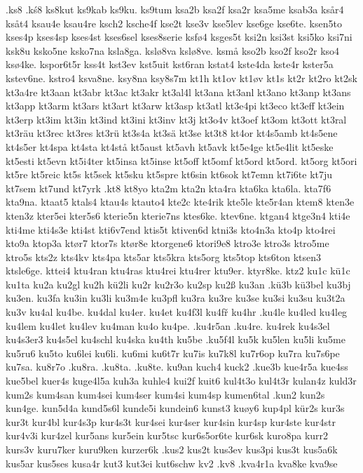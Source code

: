 {{.ks8
.kś8
ks8kut
ks9kab
ks9ku.
ks9tum
ksa2b
ksa2f
ksa2r
ksa5me
ksab3a
ksår4
ksåt4
ksau4e
ksau4re
ksch2
ksche4f
kse2t
kse3v
kse5lev
kse6ge
kse6te.
ksen5to
kses4p
kses4sp
kses4st
kses6sel
kses8serie
ksfø4
ksges5t
ksi2n
ksi3st
ksi5ko
ksi7ni
ksk8u
ksko5ne
ksko7na
ksla8ga.
kslø8va
kslø8ve.
ksmå
kso2b
kso2f
kso2r
kso4
ksø4ke.
kspor6t5r
kss4t
kst3ev
kst5uit
kst6ran
kstat4
kste4da
kste4r
kster5a
kstev6ne.
kstro4
ksva8ne.
ksy8na
ksy8s7m
kt1h
kt1ov
kt1øv
kt1s
kt2r
kt2ro
kt2sk
kt3a4re
kt3aan
kt3abr
kt3ac
kt3akr
kt3al4l
kt3ana
kt3anl
kt3ano
kt3anp
kt3ans
kt3app
kt3arm
kt3ars
kt3art
kt3arw
kt3asp
kt3atl
kt3e4pi
kt3eco
kt3eff
kt3ein
kt3erp
kt3im
kt3in
kt3ind
kt3ini
kt3inv
kt3j
kt3o4v
kt3oef
kt3om
kt3ott
kt3ral
kt3räu
kt3rec
kt3res
kt3rü
kt3s4a
kt3sä
kt3se
kt3t8
kt4or
kt4s5amb
kt4s5ene
kt4s5er
kt4spa
kt4sta
kt4stå
kt5aust
kt5avh
kt5avk
kt5e4ge
kt5e4lit
kt5eske
kt5esti
kt5evn
kt5i4ter
kt5insa
kt5inse
kt5off
kt5omf
kt5ord
kt5ord.
kt5org
kt5ori
kt5re
kt5reic
kt5s
kt5sek
kt5sku
kt5spre
kt6sin
kt6sok
kt7emn
kt7i6te
kt7ju
kt7sem
kt7und
kt7yrk
.kt8
kt8yo
kta2m
kta2n
kta4ra
kta6ka
kta6la.
kta7f6
kta9na.
ktaat5
ktals4
ktau4s
ktauto4
kte2c
kte4rik
kte5le
kte5r4an
ktem8
kten3e
kten3z
kter5ei
kter5s6
kterie5n
kterie7ns
ktes6ke.
ktev6ne.
ktgan4
ktge3n4
kti4e
kti4me
kti4s3e
kti4st
kti6v7end
ktis5t
ktiven6d
ktni3s
kto4n3a
kto4p
kto4rei
kto9a
ktop3a
ktør7
ktor7s
ktør8e
ktorgene6
ktori9e8
ktro3e
ktro3s
ktro5me
ktro5s
kts2z
kts4kv
kts4pa
kts5ar
kts5kra
kts5org
kts5top
kts6ton
ktsen3
ktsle6ge.
kttei4
ktu4ran
ktu4ras
ktu4rei
ktu4rer
ktu9er.
ktyr8ke.
ktz2
ku1c
kü1c
ku1ta
ku2a
ku2gl
ku2h
kü2li
ku2r
ku2r3o
ku2sp
ku2ß
ku3an
.kü3b
kü3bel
ku3bj
ku3en.
ku3fa
ku3in
ku3li
ku3m4e
ku3pfl
ku3ra
ku3re
ku3se
ku3si
ku3su
ku3t2a
ku3v
ku4al
ku4be.
ku4dal
ku4er.
ku4et
ku4f3l
ku4fř
ku4hr
.ku4le
ku4led
ku4leg
ku4lem
ku4let
ku4lev
ku4man
ku4o
ku4pe.
.ku4r5an
.ku4re.
ku4rek
ku4s3el
ku4s3er3
ku4s5el
ku4schl
ku4ska
ku4th
ku5be
.ku5f4l
ku5k
ku5len
ku5li
ku5me
ku5ru6
ku5to
ku6lei
ku6li.
ku6mi
ku6t7r
ku7is
ku7k8l
ku7r6op
ku7ra
ku7s6pe
ku7sa.
ku8r7o
.ku8ra.
.ku8ta.
.ku8te.
ku9an
kuch4
kuck2
.kue3b
kue4r5a
kue4ss
kue5bel
kuer4s
kuge4l5a
kuh3a
kuhle4
kui2f
kuit6
kul4t3o
kul4t3r
kulan4z
kuld3r
kum2s
kum4san
kum4sei
kum4ser
kum4si
kum4sp
kumen6tal
.kun2
kun2s
kun4ge.
kun5d4a
kund5s6l
kunde5i
kundein6
kunst3
kuøy6
kup4pl
kür2s
kur3s
kur3t
kur4bl
kur4s3p
kur4s3t
kur4sei
kur4ser
kur4sin
kur4sp
kur4ste
kur4str
kur4v3i
kur4zel
kur5ans
kur5ein
kur5tsc
kur6s5or6te
kur6sk
kuro8pa
kurr2
kurs3v
kuru7ker
kuru9ken
kurzer6k
.kus2
kus2t
kus3ev
kus3pi
kus3t
kus5a6k
kus5ar
kus5ses
kusa4r
kut3
kut3ei
kut6schw
kv2
.kv8
.kva4r1a
kva8ke
kva9se
}}
